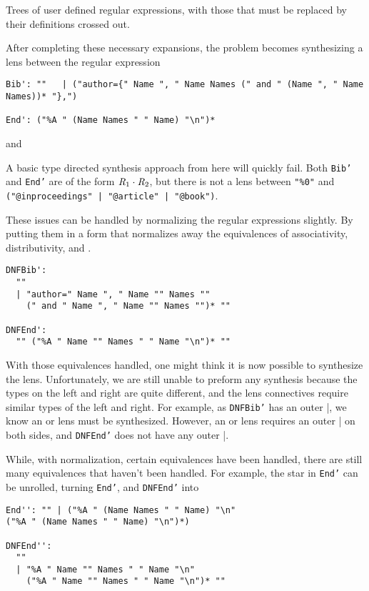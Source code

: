                                 
Trees of user defined regular expressions,
with those that must be replaced by their definitions crossed out.

After completing these necessary expansions, the problem becomes synthesizing a
lens between the regular expression
\begin{lstlisting}
Bib': ""   | ("author={" Name ", " Name Names (" and " (Name ", " Name Names))* "},")

End': ("%A " (Name Names " " Name) "\n")*
\end{lstlisting}
and

A basic type directed synthesis approach from here will quickly fail.
Both \texttt{Bib'}
and \texttt{End'} are of the form $\mathit{R}_1\cdot\mathit{R}_2$, but there is
not a lens between \texttt{"\%0"} and
\texttt{("@inproceedings" | "@article" | "@book")}.

These issues can be handled by normalizing the regular expressions slightly.
By putting them in a form that normalizes away the equivalences of
associativity, distributivity, and \EmptyString{}.

\begin{lstlisting}
DNFBib':
  ""
  | "author=" Name ", " Name "" Names ""
    (" and " Name ", " Name "" Names "")* ""

DNFEnd':
  "" ("%A " Name "" Names " " Name "\n")* ""
\end{lstlisting}

With those equivalences handled, one might think it is now possible to
synthesize the lens.
Unfortunately, we are still unable to preform any synthesis because the types
on the left and right are quite different, and the lens connectives require
similar types of the left and right.
For example, as \texttt{DNFBib'} has an outer |, we know an or lens must be
synthesized.
However, an or lens requires an outer | on both sides, and \texttt{DNFEnd'} does
not have any outer |.

While, with normalization, certain equivalences have been handled, there are
still many equivalences that haven't been handled.
For example, the star in \texttt{End'} can be unrolled, turning \texttt{End'},
and \texttt{DNFEnd'} into

\begin{lstlisting}
End'': "" | ("%A " (Name Names " " Name) "\n"
("%A " (Name Names " " Name) "\n")*)

DNFEnd'':
  ""
  | "%A " Name "" Names " " Name "\n"
    ("%A " Name "" Names " " Name "\n")* ""
\end{lstlisting}

